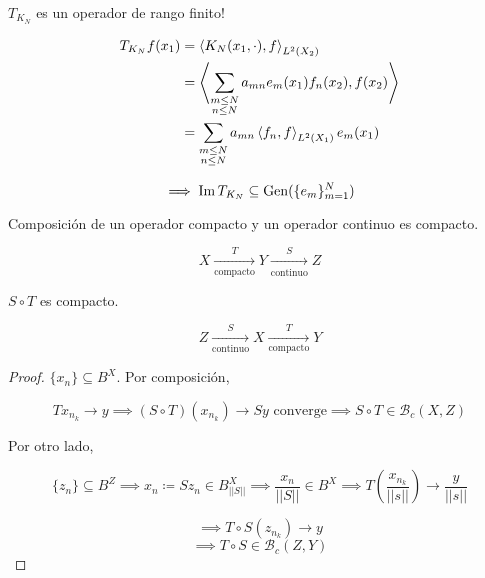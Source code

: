 \begin{fexample}
    $T_{K_N}$ es un operador de rango finito!

    \begin{align*}
        T_{K_N} f(x_1)&=\left\langle K_N(x_1,\cdot),f\right\rangle_{L^2(X_2)}\\
        &=\left\langle \sum_{\substack{m\leq N\\n\leq N}}a_{mn}e_m(x_1)f_n(x_2),f(x_2)\right\rangle\\
        &=\sum_{\substack{m\leq N\\n\leq N}}a_{mn}\left\langle f_n,f\right\rangle_{L^2(X_1)}e_m(x_1)
    \end{align*}

    \[\implies \operatorname{Im} T_{K_N}\subseteq \operatorname{Gen}(\{e_m\}_{m=1}^N)\]
\end{fexample}

\begin{fproposition}
    Composición de un operador compacto y un operador continuo es compacto.

    \[X\xrightarrow[\text{compacto}]{T}Y\xrightarrow[\text{continuo}]{S} Z\]

    $S\circ T$ es compacto.

    \[Z\xrightarrow[\text{continuo}]{S}X\xrightarrow[\text{compacto}]{T} Y\]
\end{fproposition}

\begin{proof}
    $\{x_n\}\subseteq B^X$. Por composición,

    \[Tx_{n_k}\to y\implies (S\circ T)(x_{n_k})\to Sy\text{ converge}\implies S\circ T\in\mathcal{B}_c(X,Z)\]

    Por otro lado,
    
    \[\{z_n\}\subseteq B^Z\implies x_n\coloneqq S z_n\in B_{||S||}^X\implies \frac{x_n}{||S||}\in B^X\implies T(\frac{x_{n_k}}{||s||})\to \frac{y}{||s||}\]

    \[\implies T\circ S(z_{n_k})\to y\]
    \[\implies T\circ S\in \mathcal{B}_c(Z,Y)\]
\end{proof}